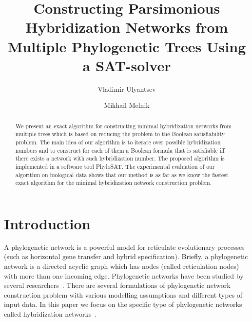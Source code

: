 \documentclass[runningheads, envcountsame, a4paper]{llncs}
\begin{document}
\mainmatter           
\title{Constructing Parsimonious Hybridization Networks from Multiple Phylogenetic Trees Using a SAT-solver}
\toctitle{ }

\author{Vladimir Ulyantsev \and Mikhail Melnik}

\maketitle
\setcounter{footnote}{0}

\begin{abstract}
  We present an exact algorithm for constructing minimal hybridization networks from multiple trees 
  which is based on reducing 
  the problem to the Boolean satisfiability problem. The main idea of our algorithm is to iterate over
  possible hybridization numbers and to construct for each of them a Boolean formula that is satisfiable iff there
  exists a network with such hybridization number. The proposed algorithm is implemented in a software tool PhyloSAT.
  The experimental evaluation of our algorithm on biological data shows that our method is as far as we know the 
  fastest exact algorithm for the minimal hybridization network construction problem.

\end{abstract}

\section{Introduction}

A phylogenetic network is a powerful model for reticulate
evolutionary processes (such as horizontal gene transfer and hybrid specification).
Briefly, a phylogenetic network is a directed acyclic graph which has
nodes (called reticulation nodes) with more than one incoming edge. Phylogenetic
networks have been studied by several researchers~\cite{huson2010phylogenetic, morrison2011introduction, 
nakhleh2011evolutionary}. There are several formulations of phylogenetic network
construction problem with various modelling assumptions and different types of input data. 
In this paper we focus on the specific type of phylogenetic networks called hybridization
networks~\cite{semple2006hybridization, chen2010hybridnet}.
\end{document}
